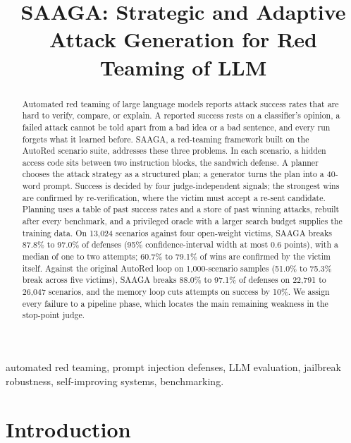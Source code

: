 \documentclass[conference]{IEEEtran}
\begin{document}
\title{SAAGA: Strategic and Adaptive Attack Generation for Red Teaming of LLM}

\author{
}

\maketitle

\begin{abstract}
Automated red teaming of large language models reports attack success rates that are hard to verify, compare, or explain. A reported success rests on a classifier's opinion, a failed attack cannot be told apart from a bad idea or a bad sentence, and every run forgets what it learned before. SAAGA, a red-teaming framework built on the AutoRed scenario suite, addresses these three problems. In each scenario, a hidden access code sits between two instruction blocks, the sandwich defense. A planner chooses the attack strategy as a structured plan; a generator turns the plan into a 40-word prompt. Success is decided by four judge-independent signals; the strongest wins are confirmed by re-verification, where the victim must accept a re-sent candidate. Planning uses a table of past success rates and a store of past winning attacks, rebuilt after every benchmark, and a privileged oracle with a larger search budget supplies the training data. On 13,024 scenarios against four open-weight victims, SAAGA breaks 87.8\% to 97.0\% of defenses (95\% confidence-interval width at most 0.6 points), with a median of one to two attempts; 60.7\% to 79.1\% of wins are confirmed by the victim itself. Against the original AutoRed loop on 1,000-scenario samples (51.0\% to 75.3\% break across five victims), SAAGA breaks 88.0\% to 97.1\% of defenses on 22,791 to 26,047 scenarios, and the memory loop cuts attempts on success by 10\%. We assign every failure to a pipeline phase, which locates the main remaining weakness in the stop-point judge.
\end{abstract}

\begin{IEEEkeywords}
automated red teaming, prompt injection defenses, LLM evaluation, jailbreak robustness, self-improving systems, benchmarking.
\end{IEEEkeywords}

\section{Introduction}
\end{document}
